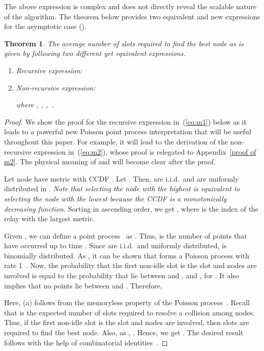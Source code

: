 \documentclass[12pt,draftcls,peerreview, onecolumn]{IEEEtran}
\newtheorem{theorem}{{\bf Theorem}}
\newcommand{\eqn}[1]{(\ref{#1})}
\newcommand{\iid}{{i.i.d.}}
\begin{document}
The above expression is complex and does not directly reveal the
scalable nature of the algorithm.  The theorem below provides two
equivalent and new expressions for the asymptotic case ().  
\begin{theorem}
  \label{m1}
  The average number of slots required to find the best node as
   is given by following two different yet
  equivalent expressions.
\begin{enumerate}
\item {\em Recursive expression:}
 


\item {\em Non-recursive expression:}

where ,
,
\mbox{},~.
\end{enumerate}
\end{theorem}
\begin{proof}
  We show the proof for the recursive expression in~\eqn{eq:m1} below
  as it leads to a powerful new Poisson point process interpretation
  that will be useful throughout this paper.  For example, it will
  lead to the derivation of the non-recursive expression
  in~\eqn{eq:m2}, whose proof is relegated to Appendix~\ref{proof of
    m2}. The physical meaning of  and  will become clear
  after the proof.

  Let node  have metric  with CCDF . Let . Then,  are i.i.d.\ and are uniformly distributed in
  .  {\it Note that selecting the node with the highest 
    is equivalent to selecting the node with the lowest 
    because the CCDF is a monotonically decreasing function.}  Sorting
   in ascending order, we get \mbox{}, where  is the index of
  the relay with the  largest metric.


  Given , we can define a point process~\cite{wolff}  as
  \mbox{}. Thus, 
  is the number of points that have occurred up to time . Since
   are \iid\ and uniformly distributed,  is
  binomially distributed.  As , it can be shown that
   forms a Poisson process with rate 1~\cite{wolff}. Now, the
  probability that the first non-idle slot is the  slot and  nodes are involved is equal to the probability that
   lie between  and , and
  , for .  It also implies that
  no points lie between  and .  Therefore,

Here, (a) follows from the memoryless property of the Poisson
process~\cite{wolff}.  Recall that  is the expected number of
slots required to resolve a collision among  nodes.  Thus, if the
first non-idle slot is the  slot and  nodes are
involved, then  slots are required to find the best node.
Also, as , . Hence, we get
.
The desired
result follows with the help of combinatorial
identities~\cite{gradshteyn00_book}.
\end{proof}
\end{document}
